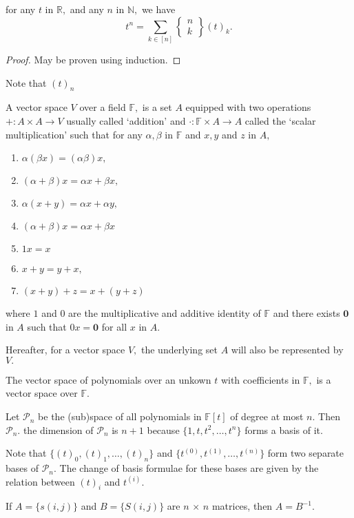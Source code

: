 \begin{theorem}
for any $t$ in $\mathbb{R},$ and any $n$ in $\mathbb{N},$ we have
$$	 t^n = \sum_{k \in [n]} 
\begin{Bmatrix} n\\k \end{Bmatrix} (t)_k. $$
\end{theorem}

\begin{proof}
	May be proven using induction.
\end{proof}

\begin{remark}
	Note that $(t)_n$ 
\end{remark}


\begin{definition}
	A vector space $V$ over a field $\mathbb{F},$ is a set
	$A$ equipped with two operations $+ \colon A \times A \to V$ usually called `addition' and
	$\cdot \colon \mathbb{F} \times A \to A$ called the `scalar multiplication' such that for any $\alpha, \beta$ in
	$\mathbb{F}$ and $x,y$ and $z$ in $A,$
	\begin{enumerate}
		\item $\alpha(\beta x) = (\alpha \beta)x,$
		\item $(\alpha + \beta) x = \alpha x + \beta x,$
		\item $\alpha(x + y) = \alpha x + \alpha y,$
		\item $(\alpha + \beta) x = \alpha x + \beta x$
		\item $ 1 x = x$
		\item $x+y = y+x,$
		\item $(x+y)+z = x + (y+z)$
	\end{enumerate}
	where $1$ and $0$ are the multiplicative and additive identity of $\mathbb{F}$ and there exists $\mathbf{0}$ in $A$ such that $0 x = \mathbf{0}$
	for all $x$ in $A.$
\end{definition}

Hereafter, for a vector space $V,$ the underlying set $A$ will also be 
represented by $V.$

The vector space of polynomials over an unkown $t$ with coefficients
in $\mathbb{F},$ is a vector space over $\mathbb{F}.$

Let $\mathcal{P}_n$ be the (sub)space of all polynomials in
$\mathbb{F}[t]$ of degree at most $n.$ Then $\mathcal{P}_n.$ 
the dimension of $\mathcal{P}_n$ is $n+1$ because $\{ 1, t, t^2,
\dotsc, t^n \}$ forms a basis of it.

Note that $\{ (t)_0, (t)_1, \dotsc, (t)_n \}$ and 
$\{ t^{(0)}, t^{(1)}, \dotsc, t^{(n)} \}$ form two separate bases of 
$\mathcal{P}_n.$ The change of basis formulae for these bases are given
by the relation between $(t)_i$ and  $t^{(i)}.$

If $A = \{ s(i,j) \}$ and $ B = \{S(i,j) \} $ are $n \, \times  \, n$
matrices, then $A = B^{-1}.$

